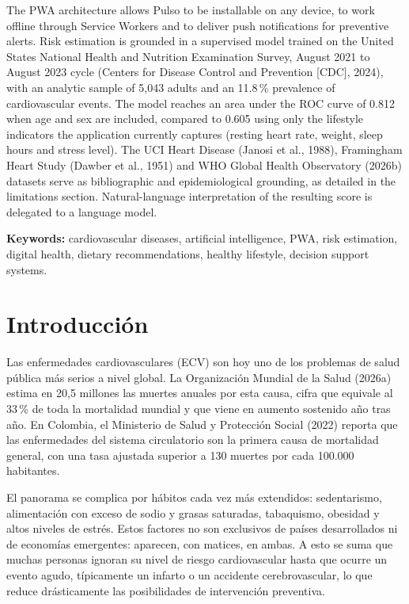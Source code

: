 \documentclass[12pt,letterpaper]{article}
\begin{document}
The PWA architecture allows Pulso to be installable on any device, to work
offline through Service Workers and to deliver push notifications for preventive
alerts. Risk estimation is grounded in a supervised model trained on the United
States National Health and Nutrition Examination Survey, August 2021 to August
2023 cycle (Centers for Disease Control and Prevention [CDC], 2024), with an
analytic sample of 5,043 adults and an 11.8\,\% prevalence of cardiovascular
events. The model reaches an area under the ROC curve of 0.812 when age and sex
are included, compared to 0.605 using only the lifestyle indicators the
application currently captures (resting heart rate, weight, sleep hours and
stress level). The UCI Heart Disease (Janosi et al., 1988), Framingham Heart
Study (Dawber et al., 1951) and WHO Global Health Observatory (2026b) datasets
serve as bibliographic and epidemiological grounding, as detailed in the
limitations section. Natural-language interpretation of the resulting score is
delegated to a language model.

\vspace{0.4cm}
\noindent\textbf{Keywords:} cardiovascular diseases, artificial intelligence,
PWA, risk estimation, digital health, dietary recommendations, healthy lifestyle,
decision support systems.


\newpage

\section{Introducción}

Las enfermedades cardiovasculares (ECV) son hoy uno de los problemas de salud
pública más serios a nivel global. La Organización Mundial de la Salud (2026a)
estima en 20,5 millones las muertes anuales por esta causa, cifra que equivale al
33\,\% de toda la mortalidad mundial y que viene en aumento sostenido año tras
año. En Colombia, el Ministerio de Salud y Protección Social (2022) reporta que
las enfermedades del sistema circulatorio son la primera causa de mortalidad
general, con una tasa ajustada superior a 130 muertes por cada 100.000
habitantes.

El panorama se complica por hábitos cada vez más extendidos: sedentarismo,
alimentación con exceso de sodio y grasas saturadas, tabaquismo, obesidad y altos
niveles de estrés. Estos factores no son exclusivos de países desarrollados ni de
economías emergentes: aparecen, con matices, en ambas. A esto se suma que muchas
personas ignoran su nivel de riesgo cardiovascular hasta que ocurre un evento
agudo, típicamente un infarto o un accidente cerebrovascular, lo que reduce
drásticamente las posibilidades de intervención preventiva.
\end{document}
